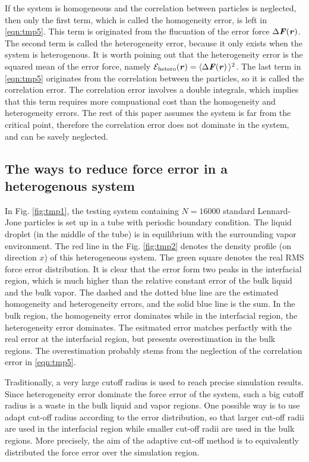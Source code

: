 \documentclass[aps,pre,preprint]{revtex4}
\renewcommand{\v}[1]{\textbf{\textit{#1}}}
\begin{document}
If the system is homogeneous and the correlation between particles is
neglected, then only the first term, which is called the homogeneity
error, is left in \eqref{eqn:tmp5}. This term is originated from the
flucuation of the error force $\Delta\v F(\v r)$. The second term is
called the heterogeneity error, because it only exists when the system
is heterogenous. It is worth poining out that the heterogeneity error
is the squared mean of the error force, namely $\mathcal
E_{\textrm{hetero}}(\v r) = \langle\Delta\v F(\v r)\,\rangle^2$.  The
last term in \eqref{eqn:tmp5} originates from the correlation between
the particles, so it is called the correlation error.  The correlation
error involves a double integrals, which implies that this term
requires more compuational cost than the homogeneity and heterogeneity
errors. The rest of this paper assumes the system is far from the
critical point, therefore the correlation error does not dominate in the
system, and can be savely neglected.


\subsection{The ways to reduce force error in a heterogenous system}

In Fig. \ref{fig:tmp1}, the testing system containing $N=16000$
standard Lennard-Jone particles is set up in a tube with periodic
boundary condition. The liquid droplet (in the middle of the tube) is
in equilibrium with the surrounding vapor environment. The red line in
the Fig. \ref{fig:tmp2} denotes the density profile (on direction $x$)
of this heterogeneous system. The green square denotes the real RMS
force error distribution. It is clear that the error form two peaks in
the interfacial region, which is much higher than the relative
constant error of the bulk liquid and the bulk vapor. The dashed and
the dotted blue line are the estimated homogeneity and heterogeneity
errors, and the solid blue line is the sum. In the bulk region, the
homogeneity error dominates while in the interfacial region, the
heterogeneity error dominates. The esitmated error matches perfactly
with the real error at the interfacial region, but presents
overestimation in the bulk regions. The overestimation probably stems
from the neglection of the correlation error in \eqref{eqn:tmp5}.

Traditionally, a very large cutoff radius is used to reach precise
simulation results. Since heterogeneity error dominate the force error
of the system, such a big cutoff radius is a waste in the bulk liquid
and vapor regions. One possible way is to use adapt cut-off radius
according to the error distribution, so that larger cut-off radii are
used in the interfacial region while smaller cut-off radii are used in
the bulk regions.  More precisely, the aim of the adaptive cut-off
method is to equivalently distributed the force error over the
simulation region.
\end{document}
